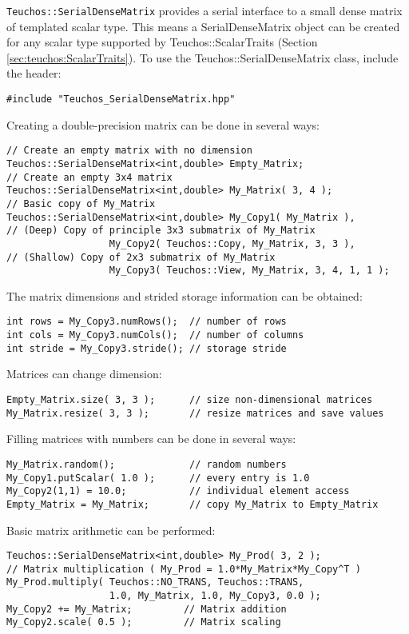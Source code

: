 \verb!Teuchos::SerialDenseMatrix! provides a serial interface to a small dense matrix
of templated scalar type.  This means a SerialDenseMatrix object can be created for any scalar type 
supported by Teuchos::ScalarTraits (Section \ref{sec:teuchos:ScalarTraits}).  To use the 
Teuchos::SerialDenseMatrix class, include the header:

{\small 
\begin{verbatim}
#include "Teuchos_SerialDenseMatrix.hpp"
\end{verbatim}}
Creating a double-precision matrix can be done in several ways:
{\small 
\begin{verbatim}
// Create an empty matrix with no dimension
Teuchos::SerialDenseMatrix<int,double> Empty_Matrix;
// Create an empty 3x4 matrix
Teuchos::SerialDenseMatrix<int,double> My_Matrix( 3, 4 );
// Basic copy of My_Matrix
Teuchos::SerialDenseMatrix<int,double> My_Copy1( My_Matrix ),
// (Deep) Copy of principle 3x3 submatrix of My_Matrix
                  My_Copy2( Teuchos::Copy, My_Matrix, 3, 3 ),
// (Shallow) Copy of 2x3 submatrix of My_Matrix
                  My_Copy3( Teuchos::View, My_Matrix, 3, 4, 1, 1 );
\end{verbatim}}
The matrix dimensions and strided storage information can be obtained:
{\small
\begin{verbatim}
int rows = My_Copy3.numRows();  // number of rows
int cols = My_Copy3.numCols();  // number of columns
int stride = My_Copy3.stride(); // storage stride
\end{verbatim}}
Matrices can change dimension:
{\small
\begin{verbatim}
Empty_Matrix.size( 3, 3 );      // size non-dimensional matrices
My_Matrix.resize( 3, 3 );       // resize matrices and save values
\end{verbatim}}
Filling matrices with numbers can be done in several ways:
{\small 
\begin{verbatim}
My_Matrix.random();             // random numbers
My_Copy1.putScalar( 1.0 );      // every entry is 1.0
My_Copy2(1,1) = 10.0;           // individual element access
Empty_Matrix = My_Matrix;       // copy My_Matrix to Empty_Matrix 
\end{verbatim}}
Basic matrix arithmetic can be performed:
{\small
\begin{verbatim}
Teuchos::SerialDenseMatrix<int,double> My_Prod( 3, 2 );
// Matrix multiplication ( My_Prod = 1.0*My_Matrix*My_Copy^T )
My_Prod.multiply( Teuchos::NO_TRANS, Teuchos::TRANS, 
                  1.0, My_Matrix, 1.0, My_Copy3, 0.0 );
My_Copy2 += My_Matrix;         // Matrix addition
My_Copy2.scale( 0.5 );         // Matrix scaling
\end{verbatim}}
